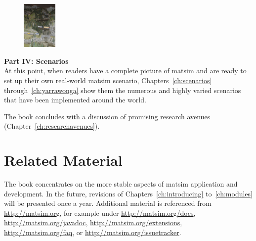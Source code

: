 \begin{figure}
\vspace{-10pt}
  \begin{center}
    \includegraphics[width=0.15\textwidth]{images/DSC00233.jpg}
  \end{center}
\end{figure}
\textbf{Part IV: Scenarios}\\
At this point, when readers have a complete picture of \gls{matsim} and are ready to set up their own real-world \gls{matsim} \gls{scenario}, Chapters~\ref{ch:scenarios} through~\ref{ch:yarrawonga} show them the numerous and highly varied scenarios that have been implemented around the world.

\vskip 1cm
The book concludes with a discussion of promising research avenues (Chapter~\ref{ch:researchavenues}).

\section*{Related Material}

The book concentrates on the more stable aspects of \gls{matsim} application and development.  In the future, revisions of Chapters~\ref{ch:introducing} to~\ref{ch:modules} will be presented once a year.  Additional material is referenced from \url{http://matsim.org}, for example under \url{http://matsim.org/docs}, \url{http://matsim.org/javadoc}, \url{http://matsim.org/extensions}, \url{http://matsim.org/faq}, or \url{http://matsim.org/issuetracker}.




